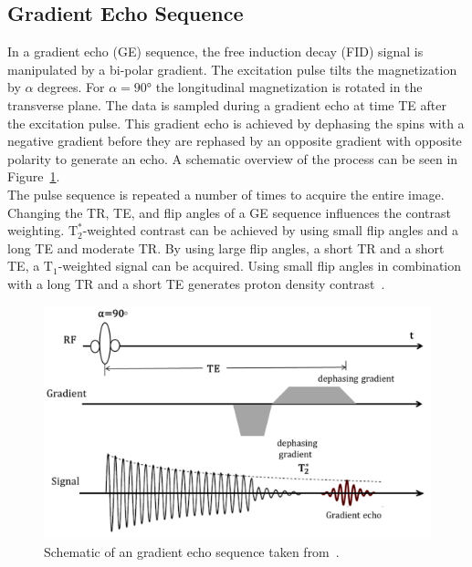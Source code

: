 \documentclass[english,version-2022-01]{uzl-thesis} %
\begin{document}
\subsection{Gradient Echo Sequence}
In a gradient echo (GE) sequence, the free induction decay (FID) signal is manipulated by a bi-polar gradient. The excitation pulse tilts the magnetization by $\alpha$ degrees. For $\alpha = 90°$ the longitudinal magnetization is rotated in the transverse plane. The data is sampled during a gradient echo at time TE after the excitation pulse. This gradient echo is achieved by dephasing the spins with a negative gradient before they are rephased by an opposite gradient with opposite polarity to generate an echo. A schematic overview of the process can be seen in Figure~\ref{fig:GradientEcho}. \\
The pulse sequence is repeated a number of times to acquire the entire image. 
Changing the TR, TE, and flip angles of a GE sequence influences the contrast weighting. $\text{T}^*_2$-weighted contrast can be achieved by using small flip angles and a long TE and moderate TR. By using large flip angles, a short TR and a short TE, a $\text{T}_1$-weighted signal can be acquired. Using small flip angles in combination with a long TR and a short TE generates proton density contrast~\cite{PulseSequences}.%

\begin{figure}[htpb]
	\centering
	\graphicspath{{images/}{\main/images/}}
	\includegraphics[width=\linewidth]{GradientEcho.png} 
	\caption{Schematic of an gradient echo sequence taken from~\cite{PulseSequences}.}
	\label{fig:GradientEcho}
\end{figure}
\end{document}
